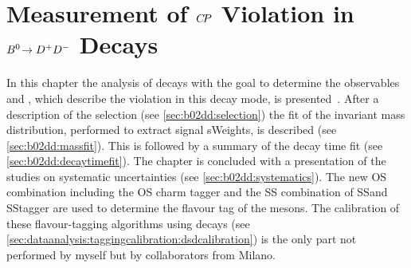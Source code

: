 
\chapter[Measurement of \texorpdfstring{$\CP$}{CP} Violation in \texorpdfstring{$\BdToDD$}{Bd2DD} Decays]{Measurement of \texorpdfstring{$\CP$}{CP} Violation in \texorpdfstring{$\BdToDD$}{Bd2DD} Decays}
\label{sec:b02dd}

In this chapter the analysis of \BdToDD decays with the goal to determine the
observables \SDD and \CDD, which describe the \CP violation in this decay
mode, is presented~\cite{LHCb-PAPER-2016-037}. After a description of the
selection (see \cref{sec:b02dd:selection}) the fit of the invariant mass
distribution, performed to extract signal sWeights, is described (see
\cref{sec:b02dd:massfit}). This is followed by a summary of the decay time fit
(see \cref{sec:b02dd:decaytimefit}). The chapter is concluded with a
presentation of the studies on systematic uncertainties (see
\cref{sec:b02dd:systematics}). The new OS combination including the OS charm
tagger and the SS combination of SS\pion and SS\proton tagger are used to
determine the flavour tag of the \Bd mesons. The calibration of these
flavour-tagging algorithms using \BdToDsD decays (see
\cref{sec:dataanalysis:taggingcalibration:dsdcalibration}) is the only part
not performed by myself but by collaborators from Milano.







